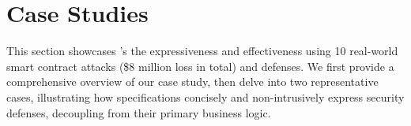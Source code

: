 \vspace{-5pt}
\section{Case Studies} \label{sec:case}


This section showcases \lang's the expressiveness and effectiveness
using 10 real-world smart contract attacks (\$8 million loss in total) and defenses. 
We first provide a comprehensive overview of our case study, then 
delve into two representative cases, illustrating
how \lang specifications concisely and non-intrusively express security defenses, 
decoupling from their primary business logic. %


